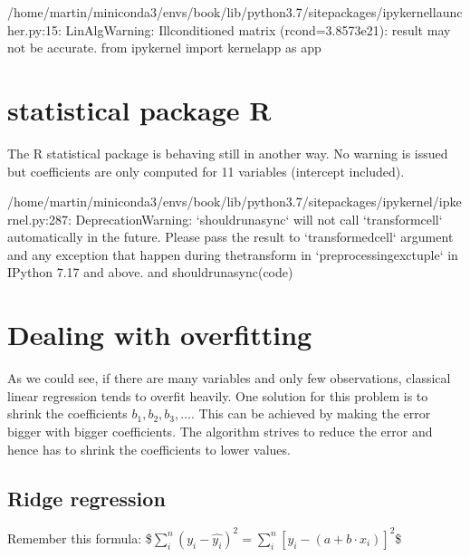 \documentclass[letterpaper,10pt,english]{jupyterBook}
\begin{document}
\begin{sphinxVerbatim}[commandchars=\\\{\}]
/home/martin/miniconda3/envs/book/lib/python3.7/site\PYGZhy{}packages/ipykernel\PYGZus{}launcher.py:15: LinAlgWarning: Ill\PYGZhy{}conditioned matrix (rcond=3.8573e\PYGZhy{}21): result may not be accurate.
  from ipykernel import kernelapp as app
\end{sphinxVerbatim}


\chapter{statistical package R}
\label{\detokenize{Regression_Techniques:statistical-package-r}}
\sphinxAtStartPar
The R statistical package is behaving still in another way. No warning is issued but coefficients are only computed for 11 variables (intercept included).

\begin{sphinxVerbatim}[commandchars=\\\{\}]
/home/martin/miniconda3/envs/book/lib/python3.7/site\PYGZhy{}packages/ipykernel/ipkernel.py:287: DeprecationWarning: `should\PYGZus{}run\PYGZus{}async` will not call `transform\PYGZus{}cell` automatically in the future. Please pass the result to `transformed\PYGZus{}cell` argument and any exception that happen during thetransform in `preprocessing\PYGZus{}exc\PYGZus{}tuple` in IPython 7.17 and above.
  and should\PYGZus{}run\PYGZus{}async(code)
\end{sphinxVerbatim}

\noindent{}


\chapter{Dealing with overfitting}
\label{\detokenize{Regression_Techniques:dealing-with-overfitting}}
\sphinxAtStartPar
As we could see, if there are many variables and only few observations, classical linear regression tends to overfit heavily.
One solution for this problem is to shrink the coefficients \(b_1, b_2, b_3, \ldots\). This can be achieved by making the error bigger with bigger coefficients. The algorithm strives to reduce the error and hence has to shrink the coefficients to lower values.


\section{Ridge regression}
\label{\detokenize{Regression_Techniques:ridge-regression}}
\sphinxAtStartPar
Remember this formula:
\$\(\sum_i^{n}(y_i - \hat{y_i})^2 = \sum_i^{n}[y_i - (a + b\cdot x_i)]^{2}\)\$
\end{document}
